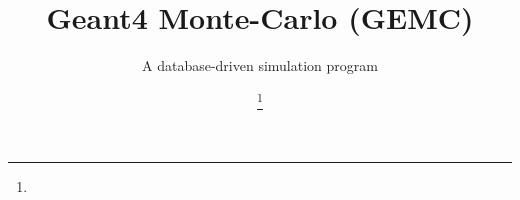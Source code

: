 \documentclass{webofc}
\begin{document}
%
    \title{Geant4 Monte-Carlo (GEMC)}
    \subtitle{A database-driven simulation program} %
%
    \author{ \fnsep\thanks{}}
%
%
    
%
    \maketitle
%


    
    
\end{document}
